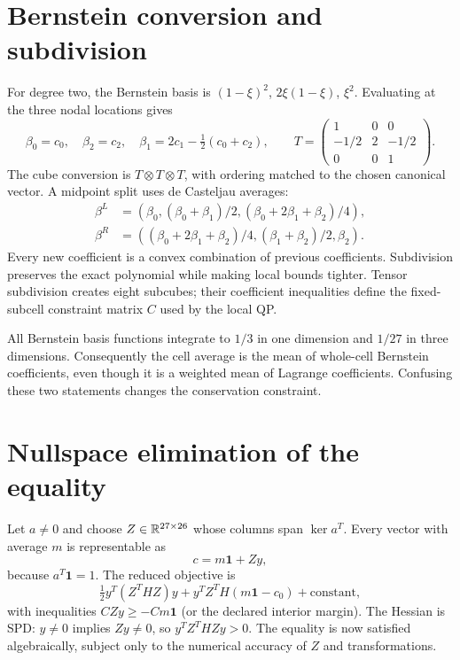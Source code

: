 \section{Bernstein conversion and subdivision}
For degree two, the Bernstein basis is $(1-\xi)^2$, $2\xi(1-\xi)$, $\xi^2$. Evaluating at the three nodal locations gives
\begin{equation}
 \beta_0=c_0,\quad \beta_2=c_2,\quad
 \beta_1=2c_1-\tfrac12(c_0+c_2),\qquad
 T=\begin{pmatrix}1&0&0\\-1/2&2&-1/2\\0&0&1\end{pmatrix}.
\end{equation}
The cube conversion is $T\otimes T\otimes T$, with ordering matched to the chosen canonical vector. A midpoint split uses de Casteljau averages:
\begin{align}
 \beta^{L}&=(\beta_0,(\beta_0+\beta_1)/2,(\beta_0+2\beta_1+\beta_2)/4),\\
 \beta^{R}&=((\beta_0+2\beta_1+\beta_2)/4,(\beta_1+\beta_2)/2,\beta_2).
\end{align}
Every new coefficient is a convex combination of previous coefficients. Subdivision preserves the exact polynomial while making local bounds tighter. Tensor subdivision creates eight subcubes; their coefficient inequalities define the fixed-subcell constraint matrix $C$ used by the local QP.

All Bernstein basis functions integrate to $1/3$ in one dimension and $1/27$ in three dimensions. Consequently the cell average is the mean of whole-cell Bernstein coefficients, even though it is a weighted mean of Lagrange coefficients. Confusing these two statements changes the conservation constraint.

\section{Nullspace elimination of the equality}
Let $a\ne0$ and choose $Z\in\mathbb R^{27\times26}$ whose columns span $\ker a^T$. Every vector with average $m$ is representable as
\begin{equation}
 c=m\mathbf1+Zy,
\end{equation}
because $a^T\mathbf1=1$. The reduced objective is
\begin{equation}
 \tfrac12y^T(Z^THZ)y+y^TZ^TH(m\mathbf1-c_0)+\text{constant},
\end{equation}
with inequalities $CZy\ge-Cm\mathbf1$ (or the declared interior margin). The Hessian is SPD: $y\ne0$ implies $Zy\ne0$, so $y^TZ^THZy>0$. The equality is now satisfied algebraically, subject only to the numerical accuracy of $Z$ and transformations.

